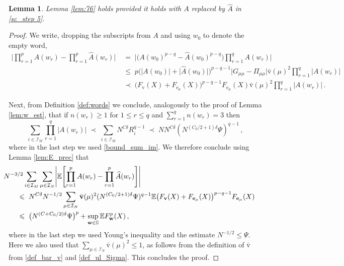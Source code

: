 \documentclass[11pt]{article} %
\newcommand{\nc}{\normalcolor}
\numberwithin{equation}{section}
\numberwithin{figure}{section}
\theoremstyle{plain} %
\newtheorem{lemma}[theorem]{Lemma}
\theoremstyle{definition} %
\newcommand{\f}[1]{\boldsymbol{\mathrm{#1}}} %
\newcommand{\bb}{\mathbb} %
\renewcommand{\cal}{\mathcal}
\newcommand{\wh}{\widehat}
\newcommand{\E}{\mathbb{E}}
\renewcommand{\leq}{\leqslant}
\renewcommand{\geq}{\geqslant}
\newcommand{\pb}[1]{\bigl({#1}\bigr)}
\newcommand{\qBB}[1]{\Biggl[{#1}\Biggr]}
\newcommand{\abs}[1]{\lvert #1 \rvert}
\newcommand{\absBB}[1]{\Biggl\lvert #1 \Biggr\rvert}
\begin{document}
\begin{lemma} \label{lem:A wt A}
Lemma \ref{lem:76} holds provided it holds with $A$ replaced by $\wh A$ in \eqref{sc_step 5}.
\end{lemma}
\begin{proof}
We write, dropping the subscripts from $A$ and using $w_0$ to denote the empty word,
\begin{align*}
\absBB{\prod_{r = 1}^{p} A(w_r) - \prod_{r = 1}^{p} \wh A(w_r)} &\;=\; \absBB{\pb{A(w_0)^{p - q} - \wh A(w_0)^{p - q}} \prod_{r = 1}^q A(w_r)}
\\
&\;\leq\; p \pb{\abs{A(w_0)} + \abs{\wh A(w_0)}}^{p - q - 1} \abs{G_{\mu \mu} - \Pi_{\mu \mu}} \bar {\f v}(\mu)^2 \prod_{r = 1}^q \abs{A(w_r)}
\\
&\;\prec\; \pb{F_{\f v}(X) + F_{\f e_\mu}(X)}^{p - q - 1} F_{\f e_\mu}(X) \bar {\f v}(\mu)^2 \prod_{r = 1}^q \abs{A(w_r)}\,.
\end{align*}
 
Next, from Definition \ref{def:words} we conclude, analogously to the proof of Lemma \ref{lem:w_est}, that if $n(w_r) \geq 1$ for $1 \leq r \leq q$ and $\sum_{r = 1}^q n(w_r) = 3$ \nc then
\begin{equation*}
\sum_{i \in \cal I_M} \prod_{r = 1}^q \abs{A(w_r)} \;\prec\;  \sum_{i \in \cal I_M} N^{C \delta} R_i^{q - 1} \;\prec\; N N^{C \delta} (N^{(C_0/2 + 1) \delta} \Psi)^{q - 1}\,,
\end{equation*}
where in the last step we used \eqref{bound_sum_im}. We therefore conclude using Lemma \ref{lem:E_prec} that
\begin{align*}
&\mspace{-30mu}N^{-3/2} \sum_{i \in \cal I_M} \sum_{\mu \in \cal I_N} \absBB{\E \qBB{\prod_{r = 1}^{p} A(w_r) - \prod_{r = 1}^{p} \wh A(w_r)}}
\\
&\;\leq\;
N^{C \delta} N^{-1/2} \sum_{\mu \in \cal I_N} \bar {\f v}(\mu)^2 (N^{(C_0/2 + 1) \delta} \Psi)^{q - 1} \E \pb{F_{\f v}(X) + F_{\f e_\mu}(X)}^{p - q - 1} F_{\f e_\mu}(X)
\\
&\;\leq\; \pb{N^{(C + C_0/2) \delta} \Psi}^p + \sup_{\f w \in \bb S} \E F_{\f w}^p(X)\,,
\end{align*}
where in the last step we used Young's inequality and the estimate $N^{-1/2} \leq \Psi$. Here we also used that $\sum_{\mu \in \cal I_N} \bar {\f v}(\mu)^2 \leq 1$, as follows from the definition of $\bar {\f v}$ from \eqref{def_bar_v} and \eqref{def_ul_Sigma}. This concludes the proof.
\end{proof}
\end{document}
